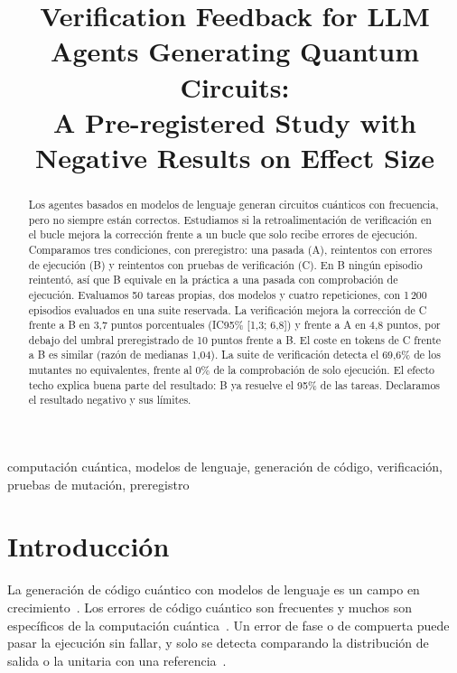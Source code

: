 \documentclass[conference]{IEEEtran}
\begin{document}
\title{Verification Feedback for LLM Agents Generating Quantum Circuits:\\ A Pre-registered Study with Negative Results on Effect Size}

\author{
}

\maketitle

\begin{abstract}
Los agentes basados en modelos de lenguaje generan circuitos cuánticos con frecuencia, pero no siempre están
correctos. Estudiamos si la retroalimentación de verificación en el bucle mejora la corrección frente a
un bucle que solo recibe errores de ejecución. Comparamos tres condiciones, con preregistro: una pasada (A),
reintentos con errores de ejecución (B) y reintentos con pruebas de verificación (C). En B ningún episodio reintentó, así que B equivale en la práctica a una pasada con comprobación de ejecución. Evaluamos 50 tareas
propias, dos modelos y cuatro repeticiones, con 1\,200 episodios evaluados en una suite reservada.
La verificación mejora la corrección de C frente a B en 3,7 puntos porcentuales (IC95\% [1,3; 6,8]) y frente a A en 4,8 puntos,
por debajo del umbral preregistrado de 10 puntos frente a B. El coste en tokens de C frente a B es similar (razón de
medianas 1,04). La suite de verificación detecta el 69,6\% de los mutantes no equivalentes, frente al 0\% de
la comprobación de solo ejecución. El efecto techo explica buena parte del resultado: B ya resuelve el 95\% de
las tareas. Declaramos el resultado negativo y sus límites.
\end{abstract}

\begin{IEEEkeywords}
computación cuántica, modelos de lenguaje, generación de código, verificación, pruebas de mutación, preregistro
\end{IEEEkeywords}

\section{Introducción}
La generación de código cuántico con modelos de lenguaje es un campo en crecimiento~\cite{qiskit_humaneval, qhackbench}.
Los errores de código cuántico son frecuentes y muchos son específicos de la computación cuántica~\cite{bugs_saner}.
Un error de fase o de compuerta puede pasar la ejecución sin fallar, y solo se detecta comparando la
distribución de salida o la unitaria con una referencia~\cite{quito, quratest}.
\end{document}
